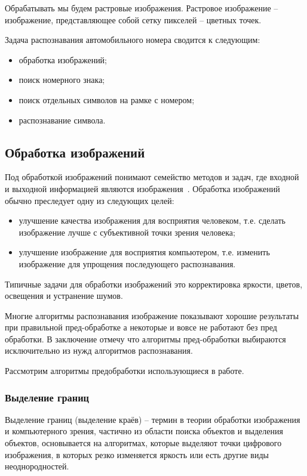 Обрабатывать мы будем растровые изображения. Растровое изображение -- изображение, представляющее собой сетку пикселей -- цветных точек.

Задача распознавания автомобильного номера сводится к следующим: 
\begin{itemize}
  \item обработка изображений;
  \item поиск номерного знака;
  \item поиск отдельных символов на рамке с номером;
  \item распознавание символа.
\end{itemize}

\subsection{Обработка изображений}
\label{sub:domain:image_processing}

Под обработкой  изображений понимают семейство  методов  и  задач,  где  входной  и  выходной информацией  являются  изображения~\cite{misoi_clides}. Обработка изображений обычно преследует одну из следующих целей:
\begin{itemize}
  \item улучшение качества изображения для восприятия человеком, т.е. сделать изображение лучше с субъективной точки зрения человека;
  \item улучшение изображение для восприятия компьютером, т.е. изменить изображение для упрощения последующего распознавания.
\end{itemize}
Типичные задачи для обработки изображений это корректировка яркости, цветов, освещения и устранение шумов. 

Многие алгоритмы распознавания изображение показывают хорошие результаты при правильной пред-обработке а некоторые и вовсе не работают без пред обработки. В заключение отмечу что алгоритмы пред-обработки выбираются исключительно из нужд алгоритмов распознавания.

Рассмотрим алгоритмы предобработки использующиеся в работе.

\subsubsection{Выделение границ}
\label{sub:domain:image_processing:edges_detection}

Выделение границ (выделение краёв) -- термин в теории обработки изображения и компьютерного зрения, частично из области поиска объектов и выделения объектов, основывается на алгоритмах, которые выделяют точки цифрового изображения, в которых резко изменяется яркость или есть другие виды неоднородностей.

